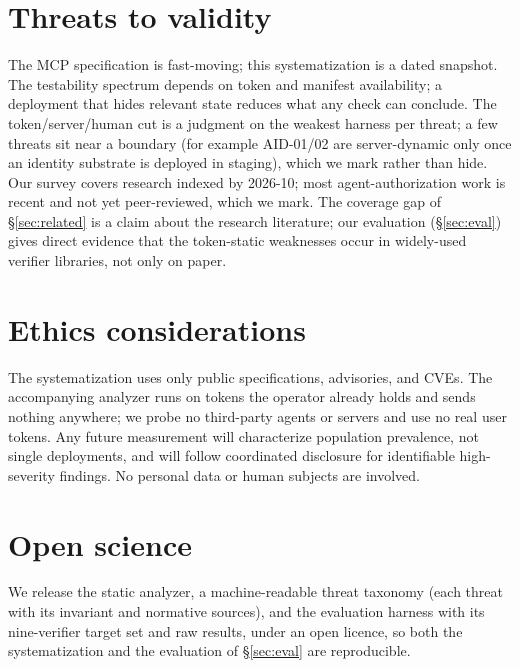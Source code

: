 \section{Threats to validity}\label{sec:validity}
The MCP specification is fast-moving; this systematization is a dated snapshot. The
testability spectrum depends on token and manifest availability; a deployment that
hides relevant state reduces what any check can conclude. The token/server/human cut
is a judgment on the weakest harness per threat; a few threats sit near a boundary
(for example AID-01/02 are server-dynamic only once an identity substrate is deployed
in staging), which we mark rather than hide. Our survey covers
research indexed by 2026-10; most agent-authorization work is recent and not yet
peer-reviewed, which we mark. The coverage gap of \S\ref{sec:related} is a claim about
the research literature; our evaluation (\S\ref{sec:eval}) gives direct evidence that
the token-static weaknesses occur in widely-used verifier libraries, not only on paper.

\section*{Ethics considerations}
The systematization uses only public specifications, advisories, and CVEs. The
accompanying analyzer runs on tokens the operator already holds and sends nothing
anywhere; we probe no third-party agents or servers and use no real user tokens. Any
future measurement will characterize population prevalence, not single deployments,
and will follow coordinated disclosure for identifiable high-severity findings. No
personal data or human subjects are involved.

\section*{Open science}
We release the static analyzer, a machine-readable threat taxonomy (each threat with
its invariant and normative sources), and the evaluation harness with its
nine-verifier target set and raw results, under an open licence, so both the
systematization and the evaluation of \S\ref{sec:eval} are reproducible.

